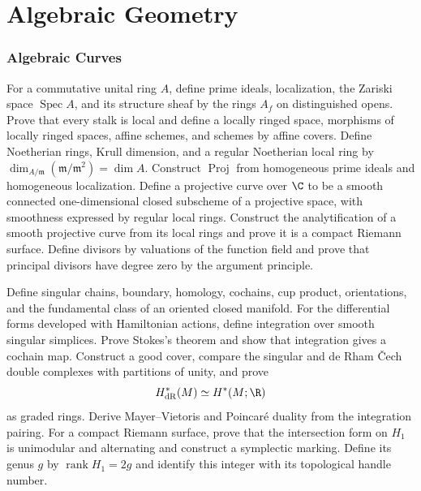 \part{Algebraic Geometry}

\section{Algebraic Curves}

\begin{exercise}
For a commutative unital ring $A$, define prime ideals, localization, the
Zariski space $\operatorname{Spec}A$, and its structure sheaf by the rings
$A_f$ on distinguished opens.  Prove that every stalk is local and define a
locally ringed space, morphisms of locally ringed spaces, affine schemes, and
schemes by affine covers.  Define Noetherian rings, Krull dimension, and a
regular Noetherian local ring by
$\dim_{A/\mathfrak m}(\mathfrak m/\mathfrak m^2)=\dim A$.  Construct
$\operatorname{Proj}$ from homogeneous prime ideals and homogeneous
localization.  Define a projective curve over
$\C$ to be a smooth connected one-dimensional closed subscheme of a
projective space, with smoothness expressed by regular local rings.  Construct
the analytification of a smooth projective curve from its local rings and
prove it is a compact Riemann surface.  Define divisors by valuations of the
function field and prove that principal divisors have degree zero by the
argument principle.
\end{exercise}

\begin{exercise}
Define singular chains, boundary, homology, cochains, cup product,
orientations, and the fundamental class of an oriented closed manifold.  For
the differential forms developed with Hamiltonian actions, define integration
over smooth singular simplices.  Prove Stokes's theorem and show that
integration gives a cochain map.  Construct a good cover, compare the singular
and de Rham \v Cech double complexes with partitions of unity, and prove
\[
 H^*_{\rm dR}(M)\simeq H^*(M;\R)
\]
as graded rings.  Derive Mayer--Vietoris and Poincar\'e duality from the
integration pairing.  For a compact Riemann surface, prove that the
intersection form on $H_1$ is unimodular and alternating and construct a
symplectic marking.  Define its genus $g$ by
$\operatorname{rank}H_1=2g$ and identify this integer with its topological
handle number.
\end{exercise}

